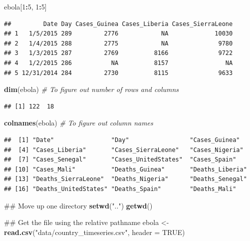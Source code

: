 \documentclass[]{book}
\makeatletter
\newenvironment{Shaded}{\begin{snugshade}}{\end{snugshade}}
\newcommand{\KeywordTok}[1]{\textcolor[rgb]{0.13,0.29,0.53}{\textbf{#1}}}
\newcommand{\DataTypeTok}[1]{\textcolor[rgb]{0.13,0.29,0.53}{#1}}
\newcommand{\DecValTok}[1]{\textcolor[rgb]{0.00,0.00,0.81}{#1}}
\newcommand{\StringTok}[1]{\textcolor[rgb]{0.31,0.60,0.02}{#1}}
\newcommand{\CommentTok}[1]{\textcolor[rgb]{0.56,0.35,0.01}{\textit{#1}}}
\newcommand{\OtherTok}[1]{\textcolor[rgb]{0.56,0.35,0.01}{#1}}
\newcommand{\OperatorTok}[1]{\textcolor[rgb]{0.81,0.36,0.00}{\textbf{#1}}}
\newcommand{\NormalTok}[1]{#1}
\newenvironment{kframe}{%
\medskip{}
\setlength{\fboxsep}{.8em}
 \def\at@end@of@kframe{}%
 \ifinner\ifhmode%
  \def\at@end@of@kframe{\end{minipage}}%
  \begin{minipage}{\columnwidth}%
 \fi\fi%
 \def\FrameCommand##1{\hskip\@totalleftmargin \hskip-\fboxsep
 \colorbox{shadecolor}{##1}\hskip-\fboxsep
     \hskip-\linewidth \hskip-\@totalleftmargin \hskip\columnwidth}%
 \MakeFramed {\advance\hsize-\width
   \@totalleftmargin\z@ \linewidth\hsize
   \@setminipage}}%
 {\par\unskip\endMakeFramed%
 \at@end@of@kframe}
\renewenvironment{Shaded}{\begin{kframe}}{\end{kframe}}
\theoremstyle{definition}
\theoremstyle{definition}
\theoremstyle{definition}
\theoremstyle{remark}
\makeatother
\begin{document}
\begin{Shaded}
\begin{Highlighting}[]
\NormalTok{ebola[}\DecValTok{1}\OperatorTok{:}\DecValTok{5}\NormalTok{, }\DecValTok{1}\OperatorTok{:}\DecValTok{5}\NormalTok{]}
\end{Highlighting}
\end{Shaded}

\begin{verbatim}
##         Date Day Cases_Guinea Cases_Liberia Cases_SierraLeone
## 1   1/5/2015 289         2776            NA             10030
## 2   1/4/2015 288         2775            NA              9780
## 3   1/3/2015 287         2769          8166              9722
## 4   1/2/2015 286           NA          8157                NA
## 5 12/31/2014 284         2730          8115              9633
\end{verbatim}

\begin{Shaded}
\begin{Highlighting}[]
\KeywordTok{dim}\NormalTok{(ebola) }\CommentTok{# To figure out number of rows and columns}
\end{Highlighting}
\end{Shaded}

\begin{verbatim}
## [1] 122  18
\end{verbatim}

\begin{Shaded}
\begin{Highlighting}[]
\KeywordTok{colnames}\NormalTok{(ebola) }\CommentTok{# To figure out column names}
\end{Highlighting}
\end{Shaded}

\begin{verbatim}
##  [1] "Date"                "Day"                 "Cases_Guinea"       
##  [4] "Cases_Liberia"       "Cases_SierraLeone"   "Cases_Nigeria"      
##  [7] "Cases_Senegal"       "Cases_UnitedStates"  "Cases_Spain"        
## [10] "Cases_Mali"          "Deaths_Guinea"       "Deaths_Liberia"     
## [13] "Deaths_SierraLeone"  "Deaths_Nigeria"      "Deaths_Senegal"     
## [16] "Deaths_UnitedStates" "Deaths_Spain"        "Deaths_Mali"
\end{verbatim}

\begin{Shaded}
\begin{Highlighting}[]
\NormalTok{## Move up one directory}
\KeywordTok{setwd}\NormalTok{(}\StringTok{".."}\NormalTok{)}
\KeywordTok{getwd}\NormalTok{() }

\NormalTok{## Get the file using the relative pathname}
\NormalTok{ebola <-}\StringTok{ }\KeywordTok{read.csv}\NormalTok{(}\StringTok{"data/country_timeseries.csv"}\NormalTok{, }\DataTypeTok{header =} \OtherTok{TRUE}\NormalTok{) }
\end{Highlighting}
\end{Shaded}
\end{document}
